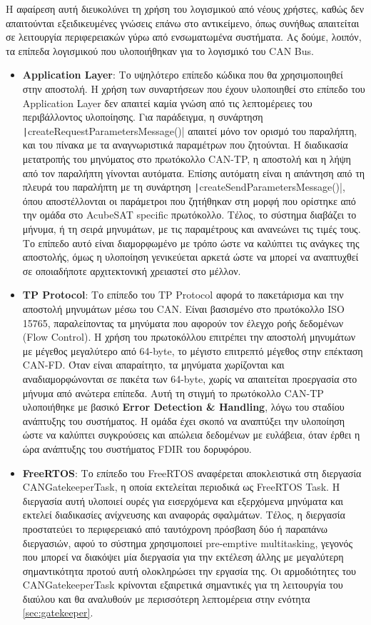 \documentclass[a4paper,nobib,justified]{tufte-book}
\begin{document}
Η αφαίρεση αυτή διευκολύνει τη χρήση του λογισμικού από νέους χρήστες, καθώς δεν απαιτούνται εξειδικευμένες γνώσεις επάνω στο αντικείμενο, όπως συνήθως απαιτείται σε λειτουργία περιφερειακών γύρω από ενσωματωμένα συστήματα. Ας δούμε, λοιπόν, τα επίπεδα λογισμικού που υλοποιήθηκαν για το λογισμικό του CAN Bus.

\begin{itemize}
	\item \textbf{Application Layer}: Το υψηλότερο επίπεδο κώδικα που θα χρησιμοποιηθεί στην αποστολή. Η χρήση των συναρτήσεων που έχουν υλοποιηθεί στο επίπεδο του Application Layer δεν απαιτεί καμία γνώση από τις λεπτομέρειες του περιβάλλοντος υλοποίησης. Για παράδειγμα, η συνάρτηση \texttt|createRequestParametersMessage()| απαιτεί μόνο τον ορισμό του παραλήπτη, και του πίνακα με τα αναγνωριστικά παραμέτρων που ζητούνται. Η διαδικασία μετατροπής του μηνύματος στο πρωτόκολλο CAN-TP, η αποστολή και η λήψη από τον παραλήπτη γίνονται αυτόματα. Επίσης αυτόματη είναι η απάντηση από τη πλευρά του παραλήπτη με τη συνάρτηση \texttt|createSendParametersMessage()|, όπου αποστέλλονται οι παράμετροι που ζητήθηκαν στη μορφή που ορίστηκε από την ομάδα στο AcubeSAT specific πρωτόκολλο. Τέλος, το σύστημα διαβάζει το μήνυμα, ή τη σειρά μηνυμάτων, με τις παραμέτρους και ανανεώνει τις τιμές τους. Το επίπεδο αυτό είναι διαμορφωμένο με τρόπο ώστε να καλύπτει τις ανάγκες της αποστολής, όμως η υλοποίηση γενικεύεται αρκετά ώστε να μπορεί να αναπτυχθεί σε οποιαδήποτε αρχιτεκτονική χρειαστεί στο μέλλον.
	\item \textbf{TP Protocol}: Το επίπεδο του TP Protocol αφορά το πακετάρισμα και την αποστολή μηνυμάτων μέσω του CAN. Είναι βασισμένο στο πρωτόκολλο ISO 15765, παραλείποντας τα μηνύματα που αφορούν τον έλεγχο ροής δεδομένων (Flow Control). Η χρήση του πρωτοκόλλου επιτρέπει την αποστολή μηνυμάτων με μέγεθος μεγαλύτερο από 64-byte, το μέγιστο επιτρεπτό μέγεθος στην επέκταση CAN-FD. Όταν είναι απαραίτητο, τα μηνύματα χωρίζονται και αναδιαμορφώνονται σε πακέτα των 64-byte, χωρίς να απαιτείται προεργασία στο μήνυμα από ανώτερα επίπεδα. Αυτή τη στιγμή το πρωτόκολλο CAN-TP υλοποιήθηκε με βασικό \textbf{Error Detection \& Handling}, λόγω του σταδίου ανάπτυξης του συστήματος. Η ομάδα έχει σκοπό να αναπτύξει την υλοποίηση ώστε να καλύπτει συγκρούσεις και απώλεια δεδομένων με ευλάβεια, όταν έρθει η ώρα ανάπτυξης του συστήματος FDIR του δορυφόρου.
	\item \textbf{FreeRTOS}: Το επίπεδο του FreeRTOS αναφέρεται αποκλειστικά στη διεργασία CANGatekeeperTask, η οποία εκτελείται περιοδικά ως FreeRTOS Task. Η διεργασία αυτή υλοποιεί ουρές για εισερχόμενα και εξερχόμενα μηνύματα και εκτελεί διαδικασίες ανίχνευσης και αναφοράς σφαλμάτων. Τέλος, η διεργασία προστατεύει το περιφερειακό από ταυτόχρονη πρόσβαση δύο ή παραπάνω διεργασιών, αφού το σύστημα χρησιμοποιεί pre-emptive multitasking, γεγονός που μπορεί να διακόψει μία διεργασία για την εκτέλεση άλλης με μεγαλύτερη σημαντικότητα προτού αυτή ολοκληρώσει την εργασία της. Οι αρμοδιότητες του CANGatekeeperTask κρίνονται εξαιρετικά σημαντικές για τη λειτουργία του διαύλου και θα αναλυθούν με περισσότερη λεπτομέρεια στην ενότητα \ref{sec:gatekeeper}.

\end{itemize}
\end{document}
